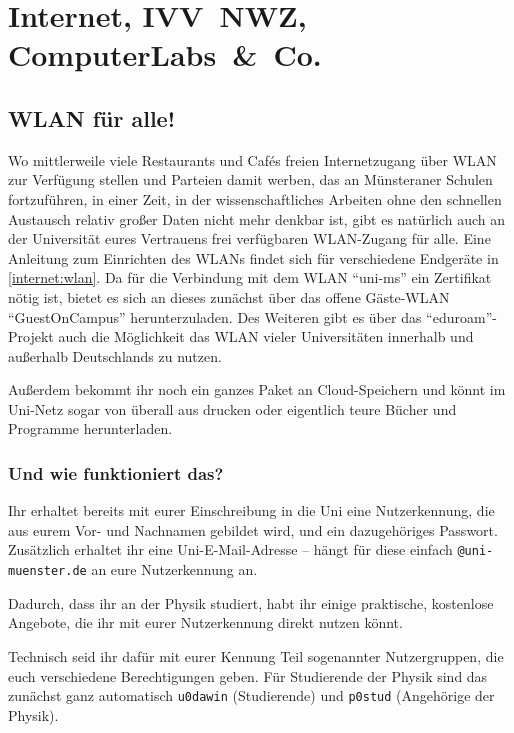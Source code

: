 \section{Internet, IVV~NWZ, Computer\-Labs~\&~Co.}
\begin{multicols}{2}
\subsection{WLAN für alle!}

Wo mittlerweile viele Restaurants und Cafés freien Internetzugang über WLAN zur Verfügung stellen und Parteien damit werben, das an Münsteraner Schulen fortzuführen, in einer Zeit, in der wissenschaftliches Arbeiten ohne den schnellen Austausch relativ großer Daten nicht mehr denkbar ist, gibt es natürlich auch an der Universität eures Vertrauens frei verfügbaren WLAN-Zugang für alle.
Eine Anleitung zum Einrichten des WLANs findet sich für verschiedene Endgeräte in \cref{internet:wlan}.
Da für die Verbindung mit dem WLAN \enquote{uni-ms} ein Zertifikat nötig ist, bietet es sich an dieses zunächst über das offene Gäste-WLAN \enquote{GuestOnCampus} herunterzuladen.
Des Weiteren gibt es über das \enquote{eduroam}-Projekt auch die Möglichkeit das WLAN vieler Universitäten innerhalb und außerhalb Deutschlands zu nutzen.

Außerdem bekommt ihr noch ein ganzes Paket an Cloud-Speichern und könnt im Uni-Netz sogar von überall aus drucken oder eigentlich teure Bücher und Programme herunterladen.

\subsubsection{Und wie funktioniert das?}
Ihr erhaltet bereits mit eurer Einschreibung in die Uni eine Nutzerkennung, die aus eurem Vor- und Nachnamen gebildet wird, und ein dazugehöriges Passwort.
Zusätzlich erhaltet ihr eine Uni-E-Mail-Adresse -- hängt für diese einfach \texttt{@uni-muenster.de} an eure Nutzerkennung an.

Dadurch, dass ihr an der \UniMuenster{} Physik studiert, habt ihr einige praktische, kostenlose Angebote, die ihr mit eurer Nutzerkennung direkt nutzen könnt.

Technisch seid ihr dafür mit eurer Kennung Teil sogenannter Nutzergruppen, die euch verschiedene Berechtigungen geben. Für Studierende der Physik sind das zunächst ganz automatisch \texttt{u0dawin} (Studierende) und \texttt{p0stud} (Angehörige der Physik).


\end{multicols}
